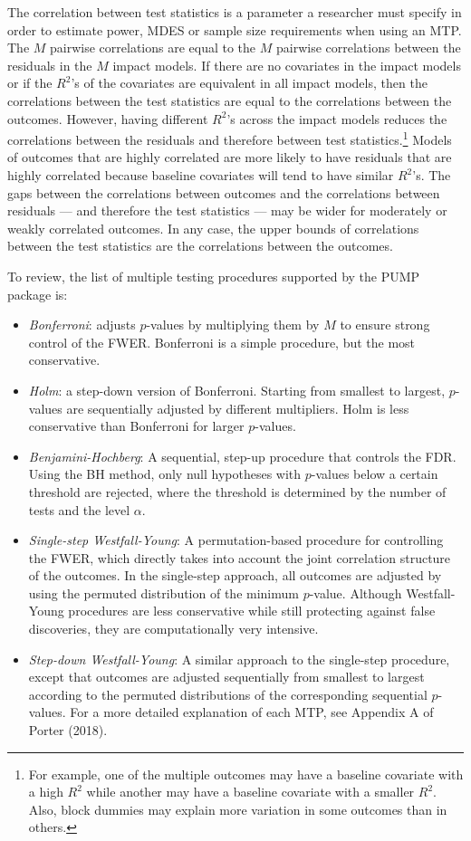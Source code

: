 \documentclass[
]{article}
\providecommand{\tightlist}{%
  \setlength{\itemsep}{0pt}\setlength{\parskip}{0pt}}
\begin{document}
The correlation between test statistics is a parameter a researcher must
specify in order to estimate power, MDES or sample size requirements
when using an MTP. The \(M\) pairwise correlations are equal to the
\(M\) pairwise correlations between the residuals in the \(M\) impact
models. If there are no covariates in the impact models or if the
\(R^2\)'s of the covariates are equivalent in all impact models, then
the correlations between the test statistics are equal to the
correlations between the outcomes. However, having different \(R^2\)'s
across the impact models reduces the correlations between the residuals
and therefore between test
statistics.\footnote{For example, one of the multiple outcomes may have a baseline covariate with a high $R^2$ while another may have a baseline covariate with
a smaller $R^2$. Also, block dummies may explain more variation in some outcomes than in others.}
Models of outcomes that are highly correlated are more likely to have
residuals that are highly correlated because baseline covariates will
tend to have similar \(R^2\)'s. The gaps between the correlations
between outcomes and the correlations between residuals --- and
therefore the test statistics --- may be wider for moderately or weakly
correlated outcomes. In any case, the upper bounds of correlations
between the test statistics are the correlations between the outcomes.

To review, the list of multiple testing procedures supported by the PUMP
package is:

\begin{itemize}
\tightlist
\item
  \emph{Bonferroni}: adjusts \(p\)-values by multiplying them by \(M\)
  to ensure strong control of the FWER. Bonferroni is a simple
  procedure, but the most conservative.
\item
  \emph{Holm}: a step-down version of Bonferroni. Starting from smallest
  to largest, \(p\)-values are sequentially adjusted by different
  multipliers. Holm is less conservative than Bonferroni for larger
  \(p\)-values.
\item
  \emph{Benjamini-Hochberg}: A sequential, step-up procedure that
  controls the FDR. Using the BH method, only null hypotheses with
  \(p\)-values below a certain threshold are rejected, where the
  threshold is determined by the number of tests and the level
  \(\alpha\).
\item
  \emph{Single-step Westfall-Young}: A permutation-based procedure for
  controlling the FWER, which directly takes into account the joint
  correlation structure of the outcomes. In the single-step approach,
  all outcomes are adjusted by using the permuted distribution of the
  minimum \(p\)-value. Although Westfall-Young procedures are less
  conservative while still protecting against false discoveries, they
  are computationally very intensive.
\item
  \emph{Step-down Westfall-Young}: A similar approach to the single-step
  procedure, except that outcomes are adjusted sequentially from
  smallest to largest according to the permuted distributions of the
  corresponding sequential \(p\)-values. For a more detailed explanation
  of each MTP, see Appendix A of Porter (2018).
\end{itemize}
\end{document}
